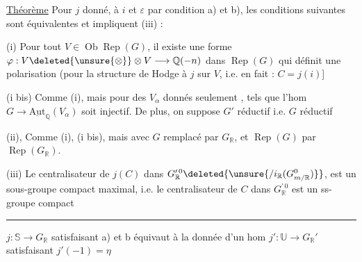 \uline{Théorème} Pour $j$ donné,  à $i$ et $\varepsilon$ par condition a) et b), les conditions suivantes  sont équivalentes et impliquent (iii) :

(i) Pour tout $V\in\operatorname{Ob}\operatorname{Rep}(G)$,  il existe une forme $\varphi:V\deleted{\unsure{\otimes}}\otimes V\longrightarrow\mathbb{Q}(-n)$ dans $\operatorname{Rep}(G)$ qui définit une polarisation (pour la structure de Hodge  à $j$ sur $V$, \unsure{$j$|$]$|$\}$} i.e. en fait : $C=j(i)$]

(i bis) Comme (i), mais  pour des $V_{\alpha}$ donnés seulement ,  tels que  l'hom $G\longrightarrow\underline{\mathrm{Aut}}_{\mathbb{Q}}(V_{\alpha})$ soit injectif. De plus, on suppose $G'$ réductif i.e. $G$ réductif

(ii),  Comme (i), (i bis), mais avec $G$ remplacé par $G_{\mathbb{R}}$, et $\operatorname{Rep}(G)$ par $\operatorname{Rep}(G_{\mathbb{R}})$.

(iii)  Le centralisateur de $j(C)$  dans $G_{\mathbb{R}}^{\prime\,0}\deleted{\unsure{/i_{\mathbb{R}}(G_{m/\mathbb{R}}^{0})}}$,  est un sous-groupe compact maximal,  i.e. le centralisateur de $C$ dans $G_{\mathbb{R}}^{\prime\,0}$ est un ss-groupe compact 


\noindent\rule{\linewidth}{0.3pt}

\quad $j:\mathbb{S}\longrightarrow G_{\mathbb{R}}$  satisfaisant a) et b équivaut à la donnée d'un hom $j':\mathbb{U}\longrightarrow G_{\mathbb{R}}'$ satisfaisant $j'(-1)=\eta$



